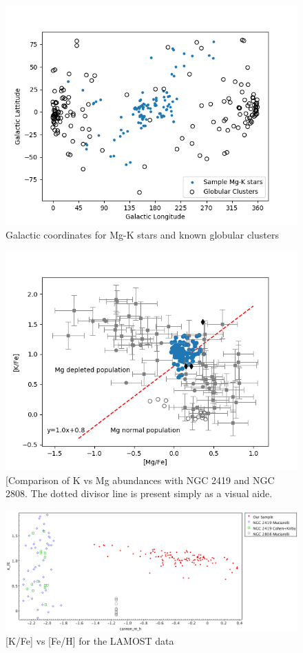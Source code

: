 \documentclass[a4paper,fleqn,usenatbib]{mnras}
\begin{document}
\begin{figure}
	\includegraphics[width=\columnwidth]{globclustof113.png}
    \caption{Galactic coordinates for Mg-K stars and known globular clusters}
    \label{galcord}
\end{figure}

\begin{figure}
	\includegraphics[width=\columnwidth]{KvsMgab.png}
    \caption{[Comparison of K vs Mg abundances with NGC 2419 and NGC 2808. The dotted divisor line is present simply as a visual aide.}
    \label{KvsMg}
\end{figure}

\begin{figure}
	\includegraphics[width=\columnwidth]{KvsFe.png}
    \caption{[K/Fe] vs [Fe/H] for the LAMOST data}
    \label{KvsFe}
\end{figure}
\end{document}
